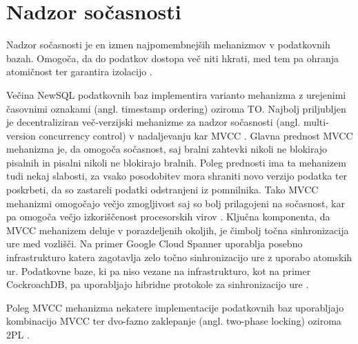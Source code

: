 \documentclass[a4paper, 12pt]{book}
\begin{document}
\section{Nadzor sočasnosti}
\label{newsql/concurrencycontroll}
Nadzor sočasnosti je en izmen najpomembnejših mehanizmov v podatkovnih bazah. Omogoča, da do podatkov dostopa več niti hkrati, med tem pa ohranja atomičnost ter garantira izolacijo \cite{Pavlo2016Sep}.

Večina NewSQL podatkovnih baz implementira varianto mehanizma z urejenimi časovnimi oznakami (angl. timestamp ordering) oziroma TO. Najbolj priljubljen je decentraliziran več-verzijski mehanizme za nadzor so\-čas\-no\-sti (angl. multi-version concurrency control) v nadaljevanju kar MVCC \cite{Pavlo2016Sep}.
Glavna prednost MVCC mehanizma je, da omogoča sočasnost, saj bralni zahtevki nikoli ne blokirajo pisalnih in pisalni nikoli ne blokirajo bralnih. Poleg prednosti ima ta mehanizem tudi nekaj slabosti, za vsako posodobitev mora shraniti novo verzijo podatka ter poskrbeti, da so zastareli podatki odstranjeni iz pomnilnika. Tako MVCC mehanizmi omogočajo večjo zmogljivost saj so bolj prilagojeni na sočasnost, kar pa omogoča večjo izkoriščenost procesorskih virov \cite{MainMemoryDatabaseSystems}. Ključna komponenta, da MVCC mehanizem deluje v porazdeljenih okoljih, je čimbolj točna sinhronizacija ure med vozlišči. Na primer Google Cloud Spanner uporablja posebno infrastrukturo katera zagotavlja zelo točno sinhronizacijo ure z uporabo atomskih ur. Podatkovne baze, ki pa niso vezane na infrastrukturo, kot na primer CockroachDB, pa uporabljajo hibridne protokole za sinhronizacijo ure \cite{Pavlo2016Sep}.

Poleg MVCC mehanizma nekatere implementacije podatkovnih baz uporabljajo kombinacijo MVCC ter dvo-fazno zaklepanje (angl. two-phase locking) oziroma 2PL \cite{Pavlo2016Sep, MainMemoryDatabaseSystems}.

\newpage
\end{document}
